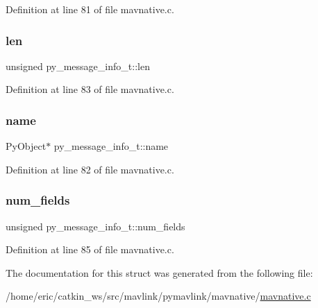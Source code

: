 Definition at line 81 of file mavnative.\+c.

\mbox{\label{structpy__message__info__t_a646d85370d95c920c9191a26bfffec98}} 
\subsubsection{\texorpdfstring{len}{len}}
{\footnotesize\ttfamily unsigned py\+\_\+message\+\_\+info\+\_\+t\+::len}



Definition at line 83 of file mavnative.\+c.

\mbox{\label{structpy__message__info__t_a87ac2fb875bbd6ec271f45acf67406cc}} 
\subsubsection{\texorpdfstring{name}{name}}
{\footnotesize\ttfamily Py\+Object$\ast$ py\+\_\+message\+\_\+info\+\_\+t\+::name}



Definition at line 82 of file mavnative.\+c.

\mbox{\label{structpy__message__info__t_a65574d6cccbb71271cfb45f491bd678d}} 
\subsubsection{\texorpdfstring{num\_fields}{num\_fields}}
{\footnotesize\ttfamily unsigned py\+\_\+message\+\_\+info\+\_\+t\+::num\+\_\+fields}



Definition at line 85 of file mavnative.\+c.



The documentation for this struct was generated from the following file\+:\begin{DoxyCompactItemize}
\item 
/home/eric/catkin\+\_\+ws/src/mavlink/pymavlink/mavnative/\mbox{\hyperlink{mavnative_8c}{mavnative.\+c}}\end{DoxyCompactItemize}
